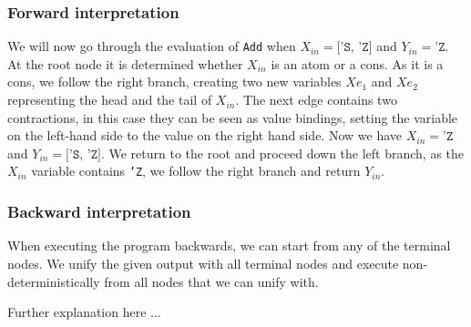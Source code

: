 \documentclass[10pt]{../sigplanconf}
\begin{document}
\subsubsection{Forward interpretation}
We will now go through the evaluation of \texttt{Add} when $X_{in} =
\texttt{['S, 'Z]}$ and $Y_{in} = \texttt{'Z}$. At the root node it is
determined whether $X_{in}$ is an atom or a cons. As it is a cons, we
follow the right branch, creating two new variables $Xe_1$ and $Xe_2$
representing the head and the tail of $X_{in}$. The next edge contains
two contractions, in this case they can be seen as value bindings,
setting the variable on the left-hand side to the value on the right
hand side. Now we have $X_{in} = \texttt{'Z}$ and $Y_{in} =
\texttt{['S, 'Z]}$. We return to the root and proceed down the left
branch, as the $X_{in}$ variable contains \texttt{'Z}, we follow the
right branch and return $Y_{in}$.

\subsubsection{Backward interpretation}
When executing the program backwards, we can start from any of the
terminal nodes. We unify the given output with all terminal nodes and
execute non-deterministically from all nodes that we can unify with.

Further explanation here ...
\end{document}
